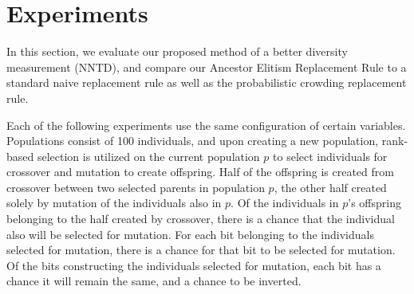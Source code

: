 \section{Experiments}
In this section, we evaluate our proposed method of a better diversity measurement (NNTD), and compare our Ancestor Elitism Replacement Rule to a standard naive replacement rule as well as the probabilistic crowding replacement rule.

Each of the following experiments use the same configuration of certain variables. Populations consist of \num{100} individuals, and upon creating a new population, rank-based selection is utilized on the current population $p$ to select individuals for crossover and mutation to create offspring. Half of the offspring is created from crossover between two selected parents in population $p$, the other half created solely by mutation of the individuals also in $p$. Of the individuals in $p$'s offspring belonging to the half created by crossover, there is a  chance that the individual also will be selected for mutation. For each bit belonging to the individuals selected for mutation, there is a  chance for that bit to be selected for mutation. Of the bits constructing the individuals selected for mutation, each bit has a  chance it will remain the same, and a  chance to be inverted.




